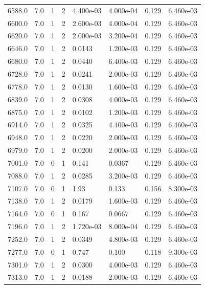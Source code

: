 \documentclass[preview]{standalone}
\begin{document}
{{{{{{{\begin{tabular}{L{1.2cm}C{1.2cm} C{0.3cm}C{0.5cm} C{1.4cm}C{1.4cm} C{1.4cm}C{1.4cm}}
  6588.0  &   7.0  & 1     &  2 &  4.400e-03  & 4.000e-04  & 0.129 &  6.460e-03   \\ 
  6600.0  &   7.0  & 1     &  2 &  2.600e-03  & 4.000e-04  & 0.129 &  6.460e-03   \\ 
  6620.0  &   7.0  & 1     &  2 &  2.000e-03  & 3.200e-04  & 0.129 &  6.460e-03   \\ 
  6646.0  &   7.0  & 1     &  2 &  0.0143  & 1.200e-03  & 0.129 &  6.460e-03   \\ 
  6680.0  &   7.0  & 1     &  2 &  0.0440  & 6.400e-03  & 0.129 &  6.460e-03   \\ 
  6728.0  &   7.0  & 1     &  2 &  0.0241  & 2.000e-03  & 0.129 &  6.460e-03   \\ 
  6778.0  &   7.0  & 1     &  2 &  0.0130  & 1.600e-03  & 0.129 &  6.460e-03   \\ 
  6839.0  &   7.0  & 1     &  2 &  0.0308  & 4.000e-03  & 0.129 &  6.460e-03   \\ 
  6875.0  &   7.0  & 1     &  2 &  0.0102  & 1.200e-03  & 0.129 &  6.460e-03   \\ 
  6914.0  &   7.0  & 1     &  2 &  0.0325  & 4.400e-03  & 0.129 &  6.460e-03   \\ 
  6948.0  &   7.0  & 1     &  2 &  0.0220  & 2.000e-03  & 0.129 &  6.460e-03   \\ 
  6979.0  &   7.0  & 1     &  2 &  0.0200  & 2.000e-03  & 0.129 &  6.460e-03   \\ 
  7001.0  &   7.0  & 0     &  1 &  0.141  & 0.0367  & 0.129 &  6.460e-03   \\ 
  7088.0  &   7.0  & 1     &  2 &  0.0285  & 3.200e-03  & 0.129 &  6.460e-03   \\ 
  7107.0  &   7.0  & 0     &  1 &  1.93  & 0.133  & 0.156 &  8.300e-03   \\ 
  7138.0  &   7.0  & 1     &  2 &  0.0179  & 1.600e-03  & 0.129 &  6.460e-03   \\ 
  7164.0  &   7.0  & 0     &  1 &  0.167  & 0.0667  & 0.129 &  6.460e-03   \\ 
  7196.0  &   7.0  & 1     &  2 &  1.720e-03  & 8.000e-04  & 0.129 &  6.460e-03   \\ 
  7252.0  &   7.0  & 1     &  2 &  0.0349  & 4.800e-03  & 0.129 &  6.460e-03   \\ 
  7277.0  &   7.0  & 0     &  1 &  0.747  & 0.100  & 0.118 &  9.300e-03   \\ 
  7301.0  &   7.0  & 1     &  2 &  0.0300  & 4.000e-03  & 0.129 &  6.460e-03   \\ 
  7313.0  &   7.0  & 1     &  2 &  0.0188  & 2.000e-03  & 0.129 &  6.460e-03   \\ 

\end{tabular}}}}}}}}
\end{document}
